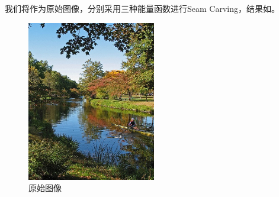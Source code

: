 \documentclass[11pt,a4paper]{article}
\begin{document}
我们将作为原始图像，分别采用三种能量函数进行Seam Carving，结果如。

\begin{figure}[H]
    \centering
    \includegraphics[width=0.5\textwidth]{../src/fig/charles.jpg}
    \caption{原始图像}
    \label{fig:charles}
\end{figure}
\end{document}
